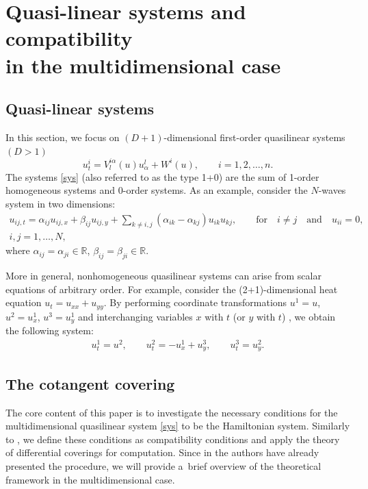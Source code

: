 \documentclass[10pt,a4paper]{amsart}
\numberwithin{equation}{section}
\begin{document}
\section[Quasi-linear systems and compatibility in the multidimensional case]{Quasi-linear systems and compatibility\\ in the multidimensional case}
\subsection{Quasi-linear systems}
In this section, we focus on $(D+1)$-dimensional first-order quasilinear systems $(D>1)$
\begin{equation}\label{sys}
u^i_t=V^{i\alpha}_l(u)u^l_\alpha+W^i(u), \qquad i=1,2,\dots, n.
\end{equation}
The systems \eqref{sys} (also referred to as the type 1+0) are the sum of 1-order homogeneous systems and 0-order systems. As an example, consider the $N$-waves system \cite{ablowitz1975nonlinear} in two dimensions:
\begin{gather}
u_{ij,t}=\alpha_{ij}u_{ij,x}+\beta_{ij}u_{ij,y}+\sum_{k\neq i,j}(\alpha_{ik}-\alpha_{kj})u_{ik}u_{kj},\qquad
\text{for}\quad i\neq j\quad \text{and}\quad u_{ii}=0, \nonumber \\
 i,j=1,\dots,N,\label{N-W}
\end{gather}
where $\alpha_{ij}=\alpha_{ji}\in\mathbb{R}$, $\beta_{ij}=\beta_{ji}\in\mathbb{R}$.


More in general, nonhomogeneous quasilinear systems can arise from scalar equations of arbitrary order. For example, consider the (2+1)-dimensional heat equation $u_t=u_{xx}+u_{yy}$. By performing coordinate transformations $u^1=u$, $u^2=u^1_x$, $u^3=u^1_y$ and interchanging variables $x$ with $t$ (or $y$ with $t$) \cite{tsarev1989hamilton}, we obtain the following system:
\begin{gather*}
u^1_t=u^2,\qquad
u^2_t=-u^1_x+u^3_y,\qquad
u^3_t=u^2_y.
\end{gather*}

\subsection{The cotangent covering}
The core content of this paper is to investigate the necessary conditions for the multidimensional quasilinear system \eqref{sys} to be the Hamiltonian system. Similarly to \cite{vergallo2023non}, we define these conditions as compatibility conditions and apply the theory of differential coverings \cite{krasil1989nonlocal} for computation. Since in \cite{vergallo2021homogeneous} the authors have already presented the procedure, we will provide a~brief overview of the theoretical framework in the multidimensional case.
\end{document}
